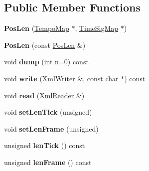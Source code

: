 \subsection*{Public Member Functions}
\begin{DoxyCompactItemize}
\item 
\mbox{\label{class_ms_1_1_pos_len_a60a7dc741591e04b561fbfa078eee422}} 
{\bfseries Pos\+Len} (\hyperlink{class_ms_1_1_tempo_map}{Tempo\+Map} $\ast$, \hyperlink{class_ms_1_1_time_sig_map}{Time\+Sig\+Map} $\ast$)
\item 
\mbox{\label{class_ms_1_1_pos_len_a13e225aa21a6a76f66811d8de6fda73c}} 
{\bfseries Pos\+Len} (const \hyperlink{class_ms_1_1_pos_len}{Pos\+Len} \&)
\item 
\mbox{\label{class_ms_1_1_pos_len_a7b541fc64a4fed55f7f8e4594c8b6f85}} 
void {\bfseries dump} (int n=0) const
\item 
\mbox{\label{class_ms_1_1_pos_len_a9e7106777208ba3c6cef8bf9145afa23}} 
void {\bfseries write} (\hyperlink{class_ms_1_1_xml_writer}{Xml\+Writer} \&, const char $\ast$) const
\item 
\mbox{\label{class_ms_1_1_pos_len_ae52f8ec2bad60ce389be6c2b4b42c79e}} 
void {\bfseries read} (\hyperlink{class_ms_1_1_xml_reader}{Xml\+Reader} \&)
\item 
\mbox{\label{class_ms_1_1_pos_len_ad33e9220502ffa6841995c85cb3033dd}} 
void {\bfseries set\+Len\+Tick} (unsigned)
\item 
\mbox{\label{class_ms_1_1_pos_len_a99e07b31c4d1ebe8a4276ff081191db9}} 
void {\bfseries set\+Len\+Frame} (unsigned)
\item 
\mbox{\label{class_ms_1_1_pos_len_acf4ae0cb2012f0013e7753043cef2a0e}} 
unsigned {\bfseries len\+Tick} () const
\item 
\mbox{\label{class_ms_1_1_pos_len_ada6e1f9fbe642e9e736e5258d952f075}} 
unsigned {\bfseries len\+Frame} () const
\item 
\mbox{\label{class_ms_1_1_pos_len_afba2b2e806e41bddaea44a817c9e45ee}} 

\end{DoxyCompactItemize}
